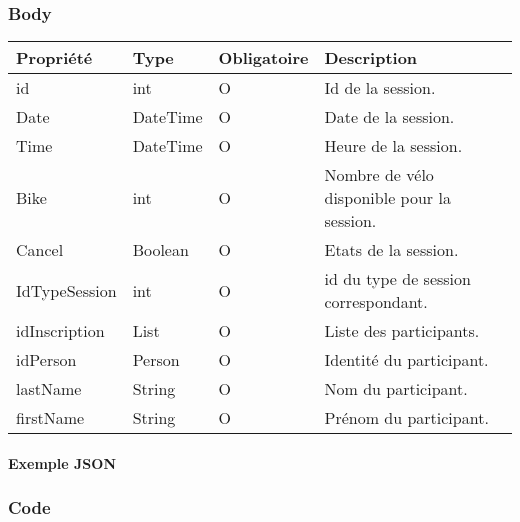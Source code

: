 	\subsubsection{Body}
		\begin{center}
			\begin{tabularx}{\textwidth}{| T{0.2122\textwidth} | S{0.22\textwidth} | S{0.15\textwidth} | S{0.3\textwidth} |}
				\hline
				Propriété & Type & Obligatoire & Description \\
				\hline
				id & int & O & Id de la session. \\
				\hline
				Date & DateTime & O & Date de la session. \\
				\hline
				Time & DateTime & O & Heure de la session. \\
				\hline
				Bike & int & O & Nombre de vélo disponible pour la session. \\
				\hline
				Cancel & Boolean & O & Etats de la session. \\
				\hline
				IdTypeSession & int & O & id du type de session correspondant. \\
				\hline
				idInscription & List & O & Liste des participants. \\
				\hline
				idPerson & Person & O & Identité du participant. \\
				\hline
				lastName & String & O & Nom du participant. \\
				\hline
				firstName & String & O & Prénom du participant. \\
				\hline
			\end{tabularx}
		\end{center}
		
		\newpage
		\paragraph{Exemple JSON}
			\paragraph{}
			
			
			
	\subsubsection{Code}
		\paragraph{}
